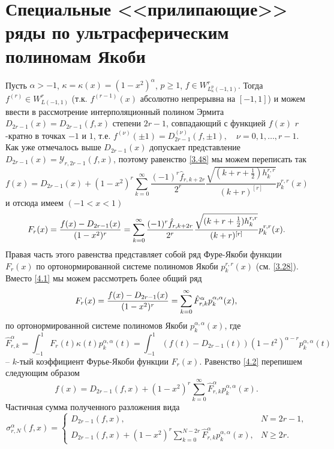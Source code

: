 \section{Специальные <<прилипающие>> ряды по ультрасферическим полиномам Якоби}
Пусть $\alpha>-1$, $\kappa=\kappa(x)=(1-x^2)^\alpha$, $p\ge1$, $f\in W^r_{L^p_\kappa(-1,1)}$. Тогда $f^{(r)}\in W^r_{L(-1,1)}$ (т.к. $f^{(r-1)}(x)$ абсолютно непрерывна на $[-1,1]$) и можем ввести в рассмотрение интерполяционный полином Эрмита $D_{2r-1}(x)=D_{2r-1}(f,x)$ степени $2r-1$,  совпадающий с функцией $f(x)$ $r$-кратно в точках $-1$ и $1$, т.е. $f^{(\nu)}(\pm1)=D_{2r-1}^{(\nu)}(f,\pm1),\quad \nu=0,1,\ldots, r-1$. Как уже отмечалось выше  $D_{2r-1}(x)$ допускает представление $D_{2r-1}(x)=\mathcal{ Y}_{r,2r-1}(f,x)$, поэтому равенство \eqref{3.48} мы можем переписать так
\begin{equation*}
f(x)=D_{2r-1}(x)+
(1-x^2)^r\sum_{k=0}^\infty\frac{(-1)^r\hat f_{r,k+2r}}{2^r} \frac{\sqrt{(k+r+\frac12)h_k^{r,r}}}{ (k+r)^{[r]}}p_{k}^{r,r}(x)
 \end{equation*}
 и отсюда имеем $(-1<x<1)$
\begin{equation}\label{4.1}
F_r(x)={f(x)-D_{2r-1}(x)\over(1-x^2)^r}=
 \sum_{k=0}^\infty\frac{(-1)^r\hat f_{r,k+2r}}{2^r} \frac{\sqrt{(k+r+\frac12)h_k^{r,r}}}{ (k+r)^{[r]}}p_{k}^{r,r}(x).
\end{equation}
Правая часть этого равенства представляет собой ряд Фуре-Якоби функции $F_r(x)$ по ортонормированной системе полиномов Якоби $p_k^{r,r}(x)$ (см. \eqref{3.28}). Вместо \eqref{4.1} мы можем рассмотреть более общий ряд
\begin{equation}\label{4.2}
F_r(x)={f(x)-D_{2r-1}(x)\over(1-x^2)^r}=
 \sum_{k=0}^\infty \hat F_{r,k}^\alpha p_{k}^{\alpha,\alpha}(x),
\end{equation}
по ортонормированной системе полиномов Якоби $p_{k}^{\alpha,\alpha}(x)$, где
\begin{equation}\label{4.3}
\hat F^\alpha_{r,k}=\int_{-1}^1F_r(t)\kappa(t) p_{k}^{\alpha,\alpha}(t)=\int_{-1}^1(f(t)-D_{2r-1}(t))(1-t^2)^{\alpha-r} p_{k}^{\alpha,\alpha}(t)
\end{equation}
-- $k$-тый коэффициент Фурье-Якоби функции $F_r(x)$. Равенство \eqref{4.2} перепишем следующим образом
\begin{equation}\label{4.4}
f(x)=D_{2r-1}(f,x)+(1-x^2)^r \sum_{k=0}^\infty \hat F^\alpha_{r,k}p_{k}^{\alpha,\alpha}(x).
\end{equation}
Частичная сумма полученного разложения вида
\begin{equation}\label{4.5}
 \sigma_{r,N}^\alpha(f,x)=
 \begin{cases}
  D_{2r-1}(f,x),&\text{$N=2r-1$,}\\
 D_{2r-1}(f,x)+(1-x^2)^r \sum_{k=0}^{N-2r} \hat F^\alpha_{r,k}p_{k}^{\alpha,\alpha}(x),&\text{$N\ge 2r$.}
 \end{cases}
\end{equation}
